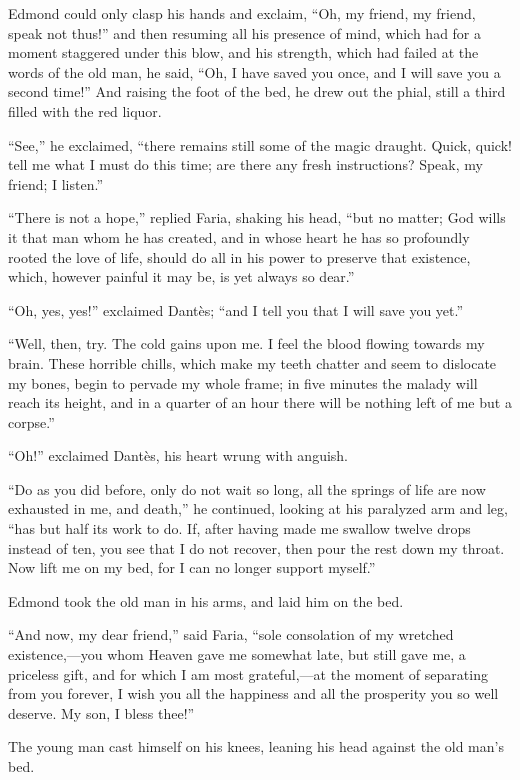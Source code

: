 Edmond could only clasp his hands and exclaim, “Oh, my friend, my
friend, speak not thus!” and then resuming all his presence of mind,
which had for a moment staggered under this blow, and his strength,
which had failed at the words of the old man, he said, “Oh, I have
saved you once, and I will save you a second time!” And raising the
foot of the bed, he drew out the phial, still a third filled with the
red liquor.

“See,” he exclaimed, “there remains still some of the magic draught.
Quick, quick! tell me what I must do this time; are there any fresh
instructions? Speak, my friend; I listen.”

“There is not a hope,” replied Faria, shaking his head, “but no matter;
God wills it that man whom he has created, and in whose heart he has so
profoundly rooted the love of life, should do all in his power to
preserve that existence, which, however painful it may be, is yet
always so dear.”

“Oh, yes, yes!” exclaimed Dantès; “and I tell you that I will save you
yet.”

“Well, then, try. The cold gains upon me. I feel the blood flowing
towards my brain. These horrible chills, which make my teeth chatter
and seem to dislocate my bones, begin to pervade my whole frame; in
five minutes the malady will reach its height, and in a quarter of an
hour there will be nothing left of me but a corpse.”

“Oh!” exclaimed Dantès, his heart wrung with anguish.

“Do as you did before, only do not wait so long, all the springs of
life are now exhausted in me, and death,” he continued, looking at his
paralyzed arm and leg, “has but half its work to do. If, after having
made me swallow twelve drops instead of ten, you see that I do not
recover, then pour the rest down my throat. Now lift me on my bed, for
I can no longer support myself.”

Edmond took the old man in his arms, and laid him on the bed.

“And now, my dear friend,” said Faria, “sole consolation of my wretched
existence,—you whom Heaven gave me somewhat late, but still gave me, a
priceless gift, and for which I am most grateful,—at the moment of
separating from you forever, I wish you all the happiness and all the
prosperity you so well deserve. My son, I bless thee!”

The young man cast himself on his knees, leaning his head against the
old man’s bed.

